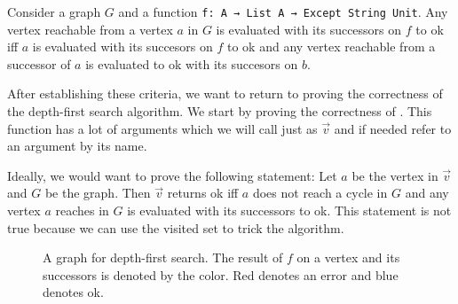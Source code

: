 \begin{lemma}[\canReachLemma]
  Consider a graph $G$ and a function \lstinline|f: A → List A → Except String Unit|.
  Any vertex reachable from a vertex $a$ in $G$ is evaluated with its successors on $f$ to ok iff $a$ is evaluated with its succesors on $f$ to ok and any vertex reachable from a successor of $a$ is evaluated to ok with its succesors on $b$.
\end{lemma}

After establishing these criteria, we want to return to proving the correctness of the depth-first search algorithm. We start by proving the correctness of \dfsstep. This function has a lot of arguments which we will call just as $\vec{v}$ and if needed refer to an argument by its name.

Ideally, we would want to prove the following statement: Let $a$ be the vertex in $\vec{v}$ and $G$ be the graph. Then \dfsstep $\vec{v}$ returns ok iff $a$ does not reach a cycle in $G$ and any vertex $a$ reaches in $G$ is evaluated with its successors to ok. This statement is not true because we can use the visited set to trick the algorithm.

\begin{figure}
  \centering
  \caption{A graph for depth-first search. The result of $f$ on a vertex and its successors is denoted by the color. Red denotes an error and blue denotes ok.}
  \label{fig:dfsSetProblem}
\end{figure}

